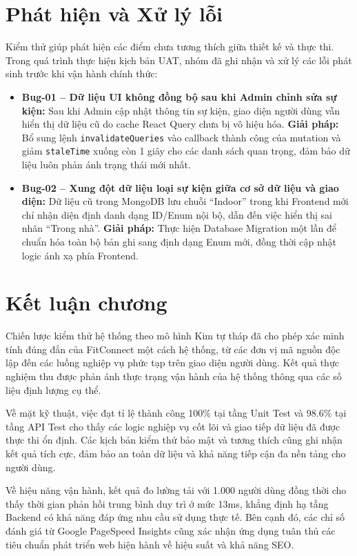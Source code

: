 \section{Phát hiện và Xử lý lỗi}
\label{sec:test_bug_tracking}

Kiểm thử giúp phát hiện các điểm chưa tương thích giữa thiết kế và thực thi. Trong quá trình thực hiện kịch bản UAT, nhóm đã ghi nhận và xử lý các lỗi phát sinh trước khi vận hành chính thức:
\begin{itemize}
    \item \textbf{Bug-01 -- Dữ liệu UI không đồng bộ sau khi Admin chỉnh sửa sự kiện:} Sau khi Admin cập nhật thông tin sự kiện, giao diện người dùng vẫn hiển thị dữ liệu cũ do cache React Query chưa bị vô hiệu hóa. \textbf{Giải pháp:} Bổ sung lệnh \texttt{invalidateQueries} vào callback thành công của mutation và giảm \texttt{staleTime} xuống còn 1 giây cho các danh sách quan trọng, đảm bảo dữ liệu luôn phản ánh trạng thái mới nhất.
    \item \textbf{Bug-02 -- Xung đột dữ liệu loại sự kiện giữa cơ sở dữ liệu và giao diện:} Dữ liệu cũ trong MongoDB lưu chuỗi ``Indoor'' trong khi Frontend mới chỉ nhận diện định danh dạng ID/Enum nội bộ, dẫn đến việc hiển thị sai nhãn ``Trong nhà''. \textbf{Giải pháp:} Thực hiện Database Migration một lần để chuẩn hóa toàn bộ bản ghi sang định dạng Enum mới, đồng thời cập nhật logic ánh xạ phía Frontend.
\end{itemize}

\section{Kết luận chương}
\label{sec:test_conclusion}

Chiến lược kiểm thử hệ thống theo mô hình Kim tự tháp đã cho phép xác minh tính đúng đắn của FitConnect một cách hệ thống, từ các đơn vị mã nguồn độc lập đến các luồng nghiệp vụ phức tạp trên giao diện người dùng. Kết quả thực nghiệm thu được phản ánh thực trạng vận hành của hệ thống thông qua các số liệu định lượng cụ thể.

Về mặt kỹ thuật, việc đạt tỉ lệ thành công 100\% tại tầng Unit Test và 98.6\% tại tầng API Test cho thấy các logic nghiệp vụ cốt lõi và giao tiếp dữ liệu đã được thực thi ổn định. Các kịch bản kiểm thử bảo mật và tương thích cũng ghi nhận kết quả tích cực, đảm bảo an toàn dữ liệu và khả năng tiếp cận đa nền tảng cho người dùng.

Về hiệu năng vận hành, kết quả đo lường tải với 1.000 người dùng đồng thời cho thấy thời gian phản hồi trung bình duy trì ở mức 13ms, khẳng định hạ tầng Backend có khả năng đáp ứng nhu cầu sử dụng thực tế. Bên cạnh đó, các chỉ số đánh giá từ Google PageSpeed Insights cũng xác nhận ứng dụng tuân thủ các tiêu chuẩn phát triển web hiện hành về hiệu suất và khả năng SEO.


